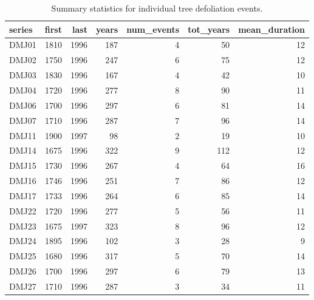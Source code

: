 \documentclass[review]{elsarticle} %
\begin{document}
\begin{table}[!h]

\caption{\label{tab:tbl-defol}Summary statistics for individual tree defoliation events.}
\centering
\begin{tabular}[t]{lrrrrrr}
\toprule
series & first & last & years & num\_events & tot\_years & mean\_duration\\
\midrule
DMJ01 & 1810 & 1996 & 187 & 4 & 50 & 12\\
DMJ02 & 1750 & 1996 & 247 & 6 & 75 & 12\\
DMJ03 & 1830 & 1996 & 167 & 4 & 42 & 10\\
DMJ04 & 1720 & 1996 & 277 & 8 & 90 & 11\\
DMJ06 & 1700 & 1996 & 297 & 6 & 81 & 14\\
\addlinespace
DMJ07 & 1710 & 1996 & 287 & 7 & 96 & 14\\
DMJ11 & 1900 & 1997 & 98 & 2 & 19 & 10\\
DMJ14 & 1675 & 1996 & 322 & 9 & 112 & 12\\
DMJ15 & 1730 & 1996 & 267 & 4 & 64 & 16\\
DMJ16 & 1746 & 1996 & 251 & 7 & 86 & 12\\
\addlinespace
DMJ17 & 1733 & 1996 & 264 & 6 & 85 & 14\\
DMJ22 & 1720 & 1996 & 277 & 5 & 56 & 11\\
DMJ23 & 1675 & 1997 & 323 & 8 & 96 & 12\\
DMJ24 & 1895 & 1996 & 102 & 3 & 28 & 9\\
DMJ25 & 1680 & 1996 & 317 & 5 & 70 & 14\\
\addlinespace
DMJ26 & 1700 & 1996 & 297 & 6 & 79 & 13\\
DMJ27 & 1710 & 1996 & 287 & 3 & 34 & 11\\
\bottomrule
\end{tabular}
\end{table}
\end{document}
